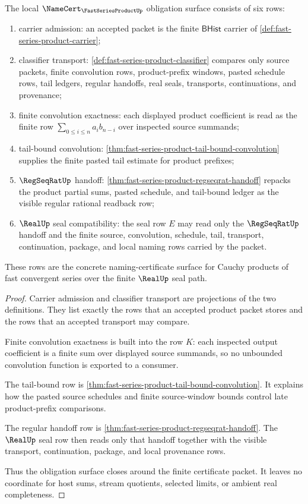 \begin{theorem}
\label{thm:fast-series-product-namecert-obligation-surface}
The local $\NameCert_{\FastSeriesProductUp}$ obligation surface consists of six rows:
\begin{enumerate}
\item carrier admission: an accepted packet is the finite $\mathsf{BHist}$ carrier of \autoref{def:fast-series-product-carrier};
\item classifier transport: \autoref{def:fast-series-product-classifier} compares only source packets, finite convolution rows, product-prefix windows, pasted schedule rows, tail ledgers, regular handoffs, real seals, transports, continuations, and provenance;
\item finite convolution exactness: each displayed product coefficient is read as the finite row $\sum_{0 \leq i \leq n} a_i b_{n-i}$ over inspected source summands;
\item tail-bound convolution: \autoref{thm:fast-series-product-tail-bound-convolution} supplies the finite pasted tail estimate for product prefixes;
\item $\RegSeqRatUp$ handoff: \autoref{thm:fast-series-product-regseqrat-handoff} repacks the product partial sums, pasted schedule, and tail-bound ledger as the visible regular rational readback row;
\item $\RealUp$ seal compatibility: the seal row $E$ may read only the $\RegSeqRatUp$ handoff and the finite source, convolution, schedule, tail, transport, continuation, package, and local naming rows carried by the packet.
\end{enumerate}
These rows are the concrete naming-certificate surface for Cauchy products of fast convergent series over the finite $\RealUp$ seal path.
\end{theorem}
\begin{proof}
Carrier admission and classifier transport are projections of the two definitions. They list exactly the rows that an accepted product packet stores and the rows that an accepted transport may compare.

Finite convolution exactness is built into the row $K$: each inspected output coefficient is a finite sum over displayed source summands, so no unbounded convolution function is exported to a consumer.

The tail-bound row is \autoref{thm:fast-series-product-tail-bound-convolution}. It explains how the pasted source schedules and finite source-window bounds control late product-prefix comparisons.

The regular handoff row is \autoref{thm:fast-series-product-regseqrat-handoff}. The $\RealUp$ seal row then reads only that handoff together with the visible transport, continuation, package, and local provenance rows.

Thus the obligation surface closes around the finite certificate packet. It leaves no coordinate for host sums, stream quotients, selected limits, or ambient real completeness.
\end{proof}

